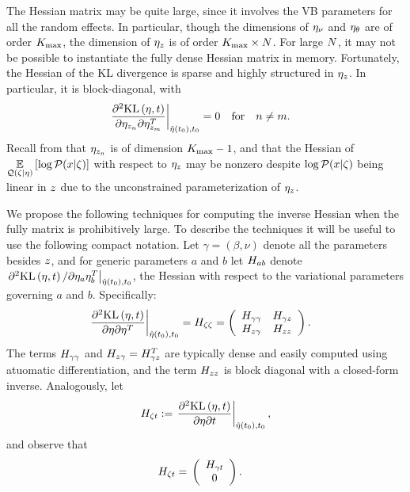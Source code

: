The Hessian matrix may be quite large, since it involves the VB parameters for
all the random effects.  In particular, though the dimensions of $\eta_{\nu}$ and
$\eta_{\theta}$ are of order ${K_{\mathrm{max}}}$, the dimension of $\eta_{z}$ is of order ${K_{\mathrm{max}}}
\times N$.  For large $N$, it may not be possible to instantiate the fully
dense Hessian matrix in memory.  Fortunately, the Hessian of the KL divergence
is sparse and highly structured in $\eta_{z}$.  In particular, it is
block-diagonal, with
%
\begin{align*}
%
\fracat{\partial^2 \KL{\eta, \t}}
       {\partial \eta_{\z_{n}} \partial \eta_{\z_{m}}^T}
       {\etaopt(\t_0), \t_0} ={}& 0 \mathtxt{for}n\ne m.
%
\end{align*}
%
Recall from  that $\eta_{z_n}$ is of dimension ${K_{\mathrm{max}}} -
1$, and that the Hessian of $\underset{\mathcal{Q}(\zeta \vert \eta)}{\mathbb{E}}\left[\log \mathcal{P}(x \vert
\zeta)\right]$ with respect to $\eta_{z}$ may be nonzero despite $\log \mathcal{P}(x \vert \zeta)$
being linear in $z$ due to the unconstrained parameterization of $\eta_{z}$.

We propose the following techniques for computing the inverse Hessian when the
fully matrix is prohibitively large.  To describe the techniques it will be
useful to use the following compact notation.  Let $\gamma = (\beta, \nu)$
denote all the parameters besides $z$, and for generic parameters $a$ and $b$
let $H_{ab}$ denote $\left.\partial^2 \mathrm{KL}\left(\eta, t\right) / \partial \eta_a
\eta_b^T\right|_{\hat\eta(t_0), t_0}$, the Hessian with respect to the variational
parameters governing $a$ and $b$.  Specifically:
%
\begin{align*}
%
\fracat{\partial^2 \KL{\eta, \t}}
       {\partial \eta \partial \eta^T}
       {\etaopt(\t_0), \t_0} ={}&
\hess{\zeta\zeta} =
\left(
\begin{array}{cc}
   \hess{\gamma\gamma} & \hess{\gamma\z} \\
   \hess{\z\gamma}     & \hess{\z\z} \\
\end{array}
\right).
%
\end{align*}
%
The terms $H_{\gamma\gamma}$ and $H_{z\gamma} = H_{\gamma z}^T$ are
typically dense and easily computed using atuomatic differentiation, and the
term $H_{zz}$ is block diagonal with a closed-form inverse.
%
Analogously, let
%
\begin{align*}
%
\hess{\zeta\t} :=
\fracat{\partial^2 \KL{\eta, \t}}
       {\partial \eta \partial \t}
       {\etaopt(\t_0), \t_0},
%
\end{align*}
%
and observe that
%
\begin{align*}
%
\hess{\zeta\t} ={}& \left( \begin{array}{c} \hess{\gamma\t} \\ 0 \end{array}\right).
%
\end{align*}

